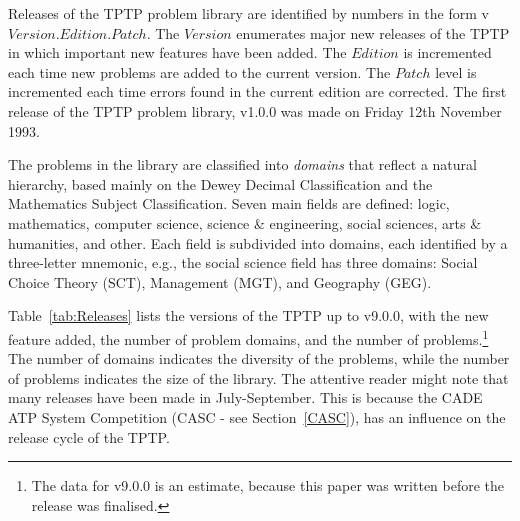 \documentclass{easychair}
\begin{document}
Releases of the TPTP problem library are identified by numbers in the form 
v$Version$.$Edition$.$Patch$.
The $Version$ enumerates major new releases of the TPTP in which important new features have 
been added.
The $Edition$ is incremented each time new problems are added to the current version.
The $Patch$ level is incremented each time errors found in the current edition are corrected. 
The first release of the TPTP problem library, v1.0.0 was made on Friday 12th November 1993. 

The problems in the library are classified into {\em domains} that reflect a natural hierarchy,
based mainly on the Dewey Decimal Classification and the Mathematics Subject Classification.
Seven main fields are defined: logic, mathematics, computer science, science \& engineering, 
social sciences, arts \& humanities, and other. 
Each field is subdivided into domains, each identified by a three-letter mnemonic, e.g., the
social science field has three domains: Social Choice Theory (SCT), Management (MGT), and
Geography (GEG).

Table~\ref{tab:Releases} lists the versions of the TPTP up to v9.0.0, with the new feature added, 
the number of problem domains, and the number of problems.\footnote{%
The data for v9.0.0 is an estimate, because this paper was written before the release was
finalised.}
The number of domains indicates the diversity of the problems, while the number of problems 
indicates the size of the library.
The attentive reader might note that many releases have been made in July-September.
This is because the CADE ATP System Competition (CASC - see Section~\ref{CASC}), has an 
influence on the release cycle of the TPTP. 
\end{document}
